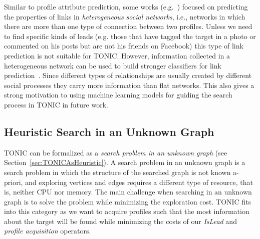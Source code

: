 \documentclass[prodmode,acmtecs]{acmsmall} %
\newcommand{\islead}[1]{{\em IsLead(#1)}}
\begin{document}
Similar to profile attribute prediction, some works (e.g.~\cite{tang2012inferring}) focused on predicting the properties of links in {\em heterogeneous social networks}, i.e., networks in which there are more than one type of connection between two profiles. 
Unless we need to find specific kinds of leads (e.g. those that have tagged the target in a photo or commented on his posts but are not his friends on Facebook) this type of link prediction is not suitable for TONIC.   
However, information collected in a heterogeneous network can be used to build stronger classifiers for link prediction~\cite{davis2011multi,dong2012link}. 
Since different types of relationships are usually created by different social processes they carry more information than flat networks. 
This also gives a strong motivation to using machine learning models for guiding the search process in TONIC in future work. 




\subsection{Heuristic Search in an Unknown Graph}
\label{sec:theWebAsAnUnknownGraph}
TONIC can be formalized  as a {\em search problem in an unknown graph} (see Section~\ref{sec:TONICAsHeuristic}). A search problem in an unknown graph is a search problem in which the structure of the searched graph is not known a-priori, and exploring vertices and edges requires a different type of resource, that is, neither CPU nor memory. The main challenge when searching in an unknown graph is to solve the problem while minimizing the exploration cost.
TONIC fits into this category  as we want to acquire profiles such that the most information about the target will be found while minimizing the costs of our {\em IsLead} and {\em profile acquisition} operators.
\end{document}
